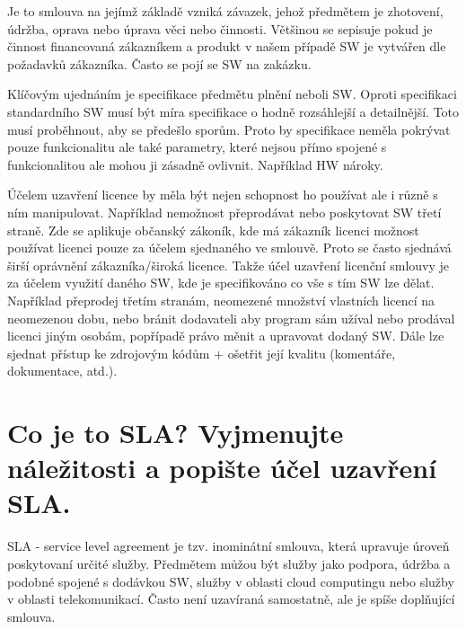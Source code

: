 \documentclass[12pt,a4paper,czech]{article}
\newcommand{\nadpis}[1]{{\section{#1}}}
\begin{document}
Je to smlouva na jejímž základě vzniká závazek, jehož předmětem je zhotovení, údržba, oprava nebo úprava věci nebo činnosti. Většinou se sepisuje pokud je činnost financovaná zákazníkem a produkt v našem případě SW je vytvářen dle požadavků zákazníka. Často se pojí se SW na zakázku.

Klíčovým ujednáním je specifikace předmětu plnění neboli SW. Oproti specifikaci standardního SW musí být míra specifikace o hodně rozsáhlejší a detailnější. Toto musí proběhnout, aby se předešlo sporům. Proto by specifikace neměla pokrývat pouze funkcionalitu ale také parametry, které nejsou přímo spojené s funkcionalitou ale mohou ji zásadně ovlivnit. Například HW nároky.

Účelem uzavření licence by měla být nejen schopnost ho používat ale i různě s ním manipulovat. Například nemožnost přeprodávat nebo poskytovat SW třetí straně. Zde se aplikuje občanský zákoník, kde má zákazník licenci možnost používat licenci pouze za účelem sjednaného ve smlouvě. Proto se často sjednává širší oprávnění zákazníka/široká licence. Takže účel uzavření licenční smlouvy je za účelem využití daného SW, kde je specifikováno co vše s tím SW lze dělat. Například přeprodej třetím stranám, neomezené množství vlastních licencí na neomezenou dobu, nebo bránit dodavateli aby program sám užíval nebo prodával licenci jiným osobám, popřípadě právo měnit a upravovat dodaný SW. Dále lze sjednat přístup ke zdrojovým kódům + ošetřit její kvalitu (komentáře, dokumentace, atd.).


\newpage
\nadpis{Co je to SLA? Vyjmenujte náležitosti a popište účel uzavření SLA.}

SLA - service level agreement je tzv. inominátní smlouva, která upravuje úroveň poskytovaní určité služby. Předmětem můžou být služby jako podpora, údržba a podobné spojené s dodávkou SW, služby v oblasti cloud computingu nebo služby v oblasti telekomunikací. Často není uzavíraná samostatně, ale je spíše doplňující smlouva.
\end{document}
